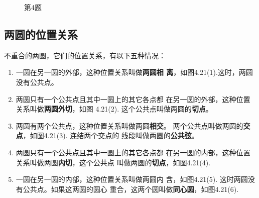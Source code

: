 \begin{figure}[htp]
    \centering
{}
    \caption*{第4题}
\end{figure}

\subsection{两圆的位置关系}
不重合的两圆，它们的位置关系，有以下五种情况：
\begin{enumerate}
\item 一圆在另一圆的外部，这种位置关系叫做\textbf{两圆相
离}，如图4.21(1).这时，两圆没有公共点。
\item 两圆只有一个公共点且其中一圆上的其它各点都
在另一圆的外部，这种位置关系叫做\textbf{两圆外切}，如图
4.21(2). 这个公共点叫做两圆的\textbf{切点}。
\item 两圆有两个公共点，这种位置关系叫做两圆\textbf{相交}。
两个公共点叫做两圆的\textbf{交点}，如图4.21(3). 连结两个交点的
线段叫做两圆的\textbf{公共弦}。
\item 两圆只有一个公共点且其中一圆上的其它各点都
在另一圆的内部，这种位置关系叫做两圆\textbf{内切}，这个公共点
叫做两圆的\textbf{切点}，如图4.21(4).
\item 一圆在另一圆的内部，这种位置关系叫做两圆内
含，如图4.21(5). 这时两圆没有公共点。如果这两圆的圆心
重合，这两个圆叫做\textbf{同心圆}，如图4.21(6).
\end{enumerate}

